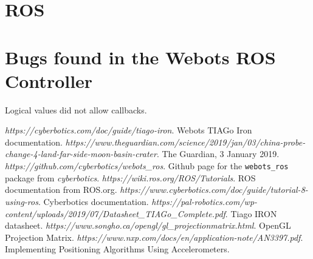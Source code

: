 \documentclass[a4paper]{article}
\begin{document}
	\section{ROS}
	
	\section{Bugs found in the Webots ROS Controller}
	Logical values did not allow callbacks.
	

	
	
	\newpage
	
	\begin{thebibliography}{9}
		\textit{https://cyberbotics.com/doc/guide/tiago-iron}. \newline
		Webots TIAGo Iron documentation.
		\textit{https://www.theguardian.com/science/2019/jan/03/china-probe-change-4-land-far-side-moon-basin-crater}. \newline
		The Guardian, 3 January 2019.
		\textit{https://github.com/cyberbotics/webots\_ros}. \newline
		Github page for the \texttt{webots\_ros} package from \textit{cyberbotics}.
		\textit{https://wiki.ros.org/ROS/Tutorials}. \newline
		ROS documentation from ROS.org.
		\textit{https://www.cyberbotics.com/doc/guide/tutorial-8-using-ros}. \newline
		Cyberbotics documentation.
		\textit{https://pal-robotics.com/wp-content/uploads/2019/07/Datasheet\_TIAGo\_Complete.pdf}. \newline
		Tiago IRON datasheet.
		\textit{https://www.songho.ca/opengl/gl\_projectionmatrix.html}. \newline
		OpenGL Projection Matrix.
		\textit{https://www.nxp.com/docs/en/application-note/AN3397.pdf}. \newline
		Implementing Positioning Algorithms Using Accelerometers.
	\end{thebibliography}
\end{document}
